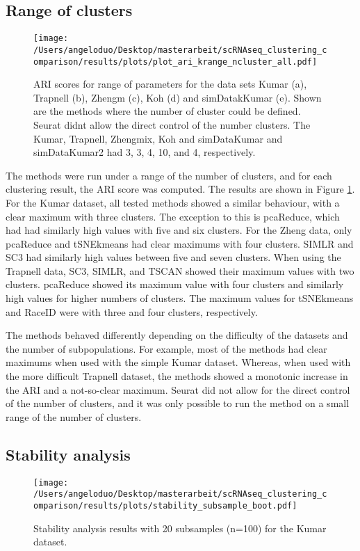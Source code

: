 \documentclass[12pt, a4paper]{article}\usepackage[]{graphicx}\usepackage[]{color}
\begin{document}
\subsection{Range of clusters}
\begin{figure}[!h]
\texttt{[image: /Users/angeloduo/Desktop/masterarbeit/scRNAseq\_clustering\_comparison/results/plots/plot\_ari\_krange\_ncluster\_all.pdf]}
\caption{ARI scores for range of parameters for the data sets Kumar (a), Trapnell (b), Zhengm (c), Koh (d) and simDatakKumar (e). Shown are the methods where the number of cluster could be defined. Seurat didnt allow the direct control of the number clusters. The Kumar, Trapnell, Zhengmix, Koh and simDataKumar and simDataKumar2 had 3, 3, 4, 10, and 4, respectively.}
\label{fig:arirangeall}
\end{figure}

The methods were run under a range of the number of clusters, and for each clustering result, the ARI score was computed. The results are shown in Figure \ref{fig:arirangeall}. For the Kumar dataset, all tested methods showed a similar behaviour, with a clear maximum with three clusters. The exception to this is pcaReduce, which had had similarly high values with five and six clusters. For the Zheng data, only pcaReduce and tSNEkmeans had clear maximums with four clusters. SIMLR and SC3 had similarly high values between five and seven clusters. When using the Trapnell data, SC3, SIMLR, and TSCAN showed their maximum values with two clusters. pcaReduce showed its maximum value with four clusters and similarly high values for higher numbers of clusters. The maximum values for tSNEkmeans and RaceID were with three and four clusters, respectively.

The methods behaved differently depending on the difficulty of the datasets and the number of subpopulations. For example, most of the methods had clear maximums when used with the simple Kumar dataset. Whereas, when used with the more difficult Trapnell dataset, the methods showed a monotonic increase in the ARI and a not-so-clear maximum. Seurat did not allow for the direct control of the number of clusters, and it was only possible to run the method on a small range of the number of clusters.



\subsection{Stability  analysis}
\begin{figure}[!h]
\texttt{[image: /Users/angeloduo/Desktop/masterarbeit/scRNAseq\_clustering\_comparison/results/plots/stability\_subsample\_boot.pdf]}
\caption{Stability analysis results with 20 subsamples (n=100) for the Kumar dataset.}
\label{fig:stab}
\end{figure}
\end{document}
